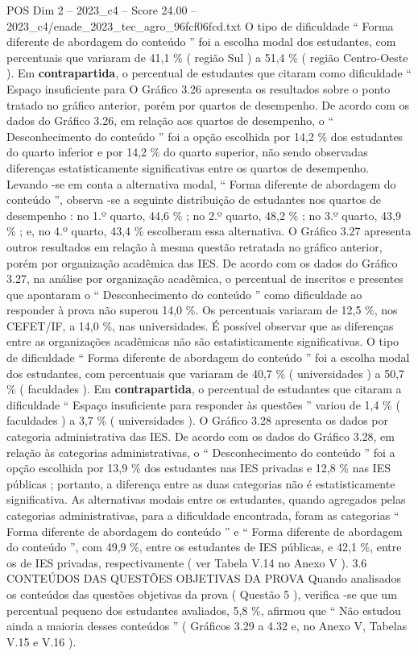 \begin{textsample}{POS Dim 2 – 2023\_c4 – Score 24.00 – 2023\_c4/enade\_2023\_tec\_agro\_96fcf06fcd.txt}
O tipo de dificuldade “ Forma diferente de abordagem do conteúdo ” foi a escolha modal dos estudantes, com percentuais que variaram de 41,1 \% ( região Sul ) a 51,4 \% ( região Centro-Oeste ).
Em \textbf{contrapartida}, o percentual de estudantes que citaram como dificuldade “ Espaço insuficiente para O Gráfico 3.26 apresenta os resultados sobre o ponto tratado no gráfico anterior, porém por quartos de desempenho.
De acordo com os dados do Gráfico 3.26, em relação aos quartos de desempenho, o “ Desconhecimento do conteúdo ” foi a opção escolhida por 14,2 \% dos estudantes do quarto inferior e por 14,2 \% do quarto superior, não sendo observadas diferenças estatisticamente significativas entre os quartos de desempenho.
Levando -se em conta a alternativa modal, “ Forma diferente de abordagem do conteúdo ”, observa -se a seguinte distribuição de estudantes nos quartos de desempenho : no 1.º quarto, 44,6 \% ; no 2.º quarto, 48,2 \% ; no 3.º quarto, 43,9 \% ; e, no 4.º quarto, 43,4 \% escolheram essa alternativa.
O Gráfico 3.27 apresenta outros resultados em relação à mesma questão retratada no gráfico anterior, porém por organização acadêmica das IES.
De acordo com os dados do Gráfico 3.27, na análise por organização acadêmica, o percentual de inscritos e presentes que apontaram o “ Desconhecimento do conteúdo ” como dificuldade ao responder à prova não superou 14,0 \%.
Os percentuais variaram de 12,5 \%, nos CEFET/IF, a 14,0 \%, nas universidades.
É possível observar que as diferenças entre as organizações acadêmicas não são estatisticamente significativas.
O tipo de dificuldade “ Forma diferente de abordagem do conteúdo ” foi a escolha modal dos estudantes, com percentuais que variaram de 40,7 \% ( universidades ) a 50,7 \% ( faculdades ).
Em \textbf{contrapartida}, o percentual de estudantes que citaram a dificuldade “ Espaço insuficiente para responder às questões ” variou de 1,4 \% ( faculdades ) a 3,7 \% ( universidades ).
O Gráfico 3.28 apresenta os dados por categoria administrativa das IES.
De acordo com os dados do Gráfico 3.28, em relação às categorias administrativas, o “ Desconhecimento do conteúdo ” foi a opção escolhida por 13,9 \% dos estudantes nas IES privadas e 12,8 \% nas IES públicas ; portanto, a diferença entre as duas categorias não é estatisticamente significativa.
As alternativas modais entre os estudantes, quando agregados pelas categorias administrativas, para a dificuldade encontrada, foram as categorias “ Forma diferente de abordagem do conteúdo ” e “ Forma diferente de abordagem do conteúdo ”, com 49,9 \%, entre os estudantes de IES públicas, e 42,1 \%, entre os de IES privadas, respectivamente ( ver Tabela V.14 no Anexo V ). 3.6 CONTEÚDOS DAS QUESTÕES OBJETIVAS DA PROVA Quando analisados os conteúdos das questões objetivas da prova ( Questão 5 ), verifica -se que um percentual pequeno dos estudantes avaliados, 5,8 \%, afirmou que “ Não estudou ainda a maioria desses conteúdos ” ( Gráficos 3.29 a 4.32 e, no Anexo V, Tabelas V.15 e V.16 ).

\end{textsample}
